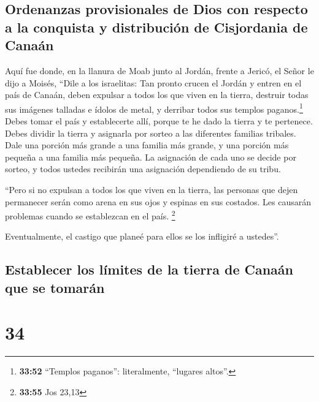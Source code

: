 \hypertarget{ordenanzas-provisionales-de-dios-con-respecto-a-la-conquista-y-distribuciuxf3n-de-cisjordania-de-canauxe1n}{%
\subsection{Ordenanzas provisionales de Dios con respecto a la conquista
y distribución de Cisjordania de
Canaán}\label{ordenanzas-provisionales-de-dios-con-respecto-a-la-conquista-y-distribuciuxf3n-de-cisjordania-de-canauxe1n}}

 Aquí fue donde, en la llanura de Moab junto al Jordán,
frente a Jericó, el Señor le dijo a Moisés,  ``Dile a los
israelitas: Tan pronto crucen el Jordán y entren en el país de Canaán,
 deben expulsar a todos los que viven en la tierra,
destruir todas sus imágenes talladas e ídolos de metal, y derribar todos
sus templos paganos.\footnote{\textbf{33:52} ``Templos paganos'':
  literalmente, ``lugares altos''.}  Debes tomar el país
y establecerte allí, porque te he dado la tierra y te pertenece.
 Debes dividir la tierra y asignarla por sorteo a las
diferentes familias tribales. Dale una porción más grande a una familia
más grande, y una porción más pequeña a una familia más pequeña. La
asignación de cada uno se decide por sorteo, y todos ustedes recibirán
una asignación dependiendo de su tribu.

 ``Pero si no expulsan a todos los que viven en la
tierra, las personas que dejen permanecer serán como arena en sus ojos y
espinas en sus costados. Les causarán problemas cuando se establezcan en
el país. \footnote{\textbf{33:55} Jos 23,13}

 Eventualmente, el castigo que planeé para ellos se los
infligiré a ustedes''.

\hypertarget{establecer-los-luxedmites-de-la-tierra-de-canauxe1n-que-se-tomaruxe1n}{%
\subsection{Establecer los límites de la tierra de Canaán que se
tomarán}\label{establecer-los-luxedmites-de-la-tierra-de-canauxe1n-que-se-tomaruxe1n}}

\hypertarget{section-33}{%
\section{34}\label{section-33}}

